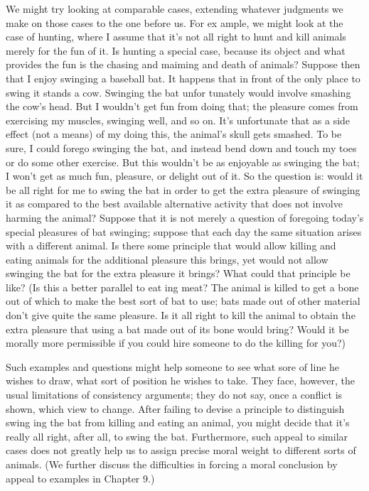 \documentclass[11pt,openany]{book}
\begin{document}
We might try looking at comparable cases, extending whatever judgments we make on those cases to the one before us. For ex ample, we might look at the case of hunting, where I assume that it's not all right to hunt and kill animals merely for the fun of it. Is hunting a special case, because its object and what provides the fun is the chasing and maiming and death of animals? Suppose then that I enjoy swinging a baseball bat. It happens that in front of the only place to swing it stands a cow. Swinging the bat unfor tunately would involve smashing the cow's head. But I wouldn't get fun from doing that; the pleasure comes from exercising my muscles, swinging well, and so on. It's unfortunate that as a side effect (not a means) of my doing this, the animal's skull gets smashed. To be sure, I could forego swinging the bat, and instead bend down and touch my toes or do some other exercise. But this wouldn't be as enjoyable as swinging the bat; I won't get as much fun, pleasure, or delight out of it. So the question is: would it be all right for me to swing the bat in order to get the extra pleasure of swinging it as compared to the best available alternative activity that does not involve harming the animal? Suppose that it is not merely a question of foregoing today's special pleasures of bat swinging; suppose that each day the same situation arises with a different animal. Is there some principle that would allow killing and eating animals for the additional pleasure this brings, yet would not allow swinging the bat for the extra pleasure it brings? What could that principle be like? (Is this a better parallel to eat ing meat? The animal is killed to get a bone out of which to make the best sort of bat to use; bats made out of other material don't give quite the same pleasure. Is it all right to kill the animal to obtain the extra pleasure that using a bat made out of its bone would bring? Would it be morally more permissible if you could hire someone to do the killing for you?) 

Such examples and questions might help someone to see what sore of line he wishes to draw, what sort of position he wishes to take. They face, however, the usual limitations of consistency arguments; they do not say, once a conflict is shown, which view to change. After failing to devise a principle to distinguish swing ing the bat from killing and eating an animal, you might decide that it's really all right, after all, to swing the bat. Furthermore, such appeal to similar cases does not greatly help us to assign precise moral weight to different sorts of animals. (We further discuss the difficulties in forcing a moral conclusion by appeal to examples in Chapter 9.) 
\end{document}
